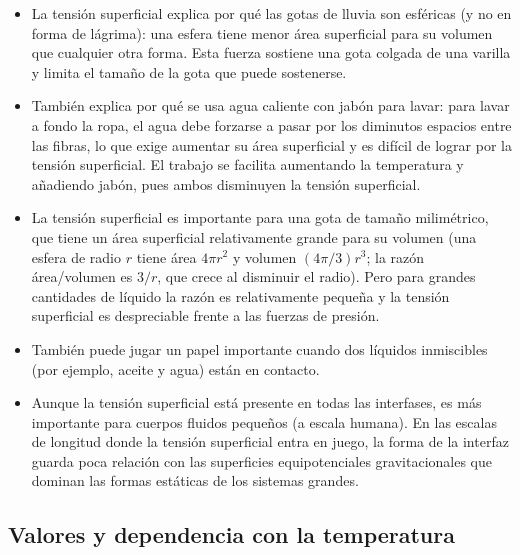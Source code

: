 \begin{itemize}
\item La tensión superficial explica por qué las gotas de lluvia son esféricas (y no en forma de lágrima): una esfera tiene menor área superficial para su volumen que cualquier otra forma. Esta fuerza sostiene una gota colgada de una varilla y limita el tamaño de la gota que puede sostenerse.
\item También explica por qué se usa agua caliente con jabón para lavar: para lavar a fondo la ropa, el agua debe forzarse a pasar por los diminutos espacios entre las fibras, lo que exige aumentar su área superficial y es difícil de lograr por la tensión superficial. El trabajo se facilita aumentando la temperatura y añadiendo jabón, pues ambos disminuyen la tensión superficial.
\item La tensión superficial es importante para una gota de tamaño milimétrico, que tiene un área superficial relativamente grande para su volumen (una esfera de radio $r$ tiene área $4\pi r^2$ y volumen $(4\pi/3)r^3$; la razón área/volumen es $3/r$, que crece al disminuir el radio). Pero para grandes cantidades de líquido la razón es relativamente pequeña y la tensión superficial es despreciable frente a las fuerzas de presión.
\item También puede jugar un papel importante cuando dos líquidos inmiscibles (por ejemplo, aceite y agua) están en contacto.
\item Aunque la tensión superficial está presente en todas las interfases, es más importante para cuerpos fluidos pequeños (a escala humana). En las escalas de longitud donde la tensión superficial entra en juego, la forma de la interfaz guarda poca relación con las superficies equipotenciales gravitacionales que dominan las formas estáticas de los sistemas grandes.
\end{itemize}

\subsection{Valores y dependencia con la temperatura}

